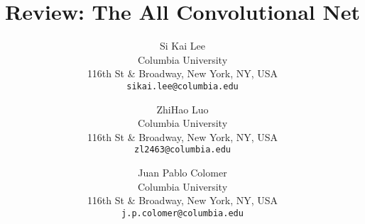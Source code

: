 \documentclass[10pt,twocolumn,letterpaper]{article}
\begin{document}

\title{Review: The All Convolutional Net}


\author{
Si Kai Lee\\
Columbia University\\
116th St \& Broadway, New York, NY, USA\\
{\tt\small sikai.lee@columbia.edu}
\and
ZhiHao Luo\\
Columbia University\\
116th St \& Broadway, New York, NY, USA\\
{\tt\small zl2463@columbia.edu}
\and
Juan Pablo Colomer\\
Columbia University\\
116th St \& Broadway, New York, NY, USA\\
{\tt\small j.p.colomer@columbia.edu}
}
\maketitle



\FloatBarrier

\FloatBarrier

\FloatBarrier

{\small


}


\end{document}
